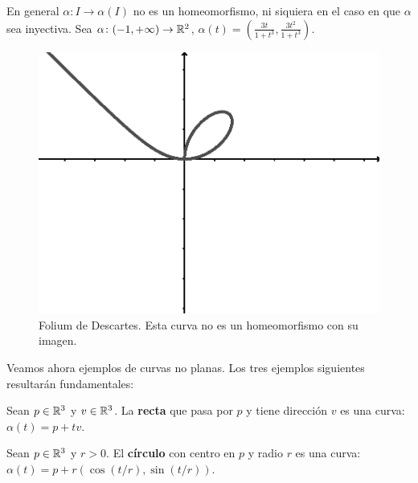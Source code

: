 \begin{example}
	En general $\alpha\colon I\to\alpha(I)$ no es un homeomorfismo, ni siquiera en
	el caso en que $\alpha$ sea inyectiva.
	Sea $\alpha\colon(-1,+\infty)\to\mathbb{R}^2$,
	$\alpha(t)=\left(\frac{3t}{1+t^3},\frac{3t^2}{1+t^3}\right)$.
	\begin{figure}
		\centering
    	\includegraphics[scale=0.5]{eps/not}
		\caption{Folium de Descartes. Esta curva no es un homeomorfismo con su imagen.}
	\end{figure}
\end{example}

Veamos ahora ejemplos de curvas no planas. 
Los tres ejemplos siguientes resultarán fundamentales:

\begin{example}
	\label{Recta}
	Sean $p\in\mathbb{R}^3$ y $v\in\mathbb{R}^3$. La \textbf{recta} que pasa por $p$ y tiene dirección
	$v$ es una curva: $\alpha(t)=p+tv$.
\end{example}

\begin{example}
	Sean $p\in\mathbb{R}^3$ y $r>0$. El \textbf{círculo} con centro en $p$ y radio $r$ es una curva:
	$\alpha(t)=p+r(\cos(t/r),\sin(t/r))$. 
\end{example}

